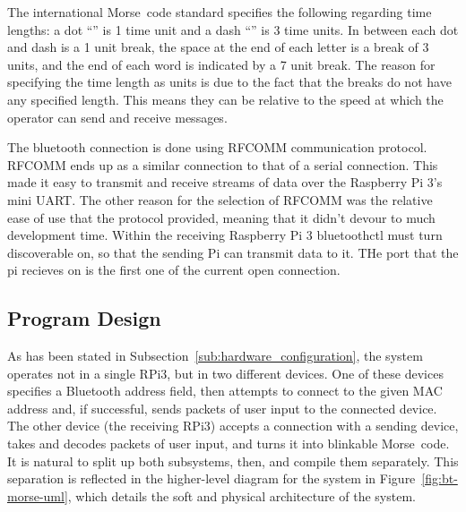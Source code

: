 \documentclass[11pt]{article}
\begin{document}
The international Morse~code standard specifies the following regarding time lengths: a dot ``\mcdot'' is 1 time unit and a dash ``\mcdash'' is 3 time units.
In between each dot and dash is a 1 unit break, the space at the end of each letter is a break of 3 units, and the end of each word is indicated by a 7 unit break.
The reason for specifying the time length as units is due to the fact that the breaks do not have any specified length.
This means they can be relative to the speed at which the operator can send and receive messages.


The bluetooth connection is done using RFCOMM communication protocol.
RFCOMM ends up as a similar connection to that of a serial connection.
This made it easy to transmit and receive streams of data over the Raspberry Pi 3's mini UART.
The other reason for the selection of RFCOMM was the relative ease of use that the protocol provided, meaning that it didn't devour to much development time.
Within the receiving Raspberry Pi 3 bluetoothctl must turn discoverable on, so that the sending Pi can transmit data to it.
THe port that the pi recieves on is the first one of the current open connection.




\subsection{Program Design}
\label{sub:program_design}




As has been stated in Subsection~\ref{sub:hardware_configuration}, the system operates not in a single RPi3, but in two different devices.
One of these devices specifies a Bluetooth address field, then attempts to connect to the given MAC address and, if successful, sends packets of user input to the connected device.
The other device (the receiving RPi3) accepts a connection with a sending device, takes and decodes packets of user input, and turns it into blinkable Morse~code.
It is natural to split up both subsystems, then, and compile them separately.
This separation is reflected in the higher-level diagram for the system in Figure~\ref{fig:bt-morse-uml}, which details the soft and physical architecture of the system.
\end{document}
